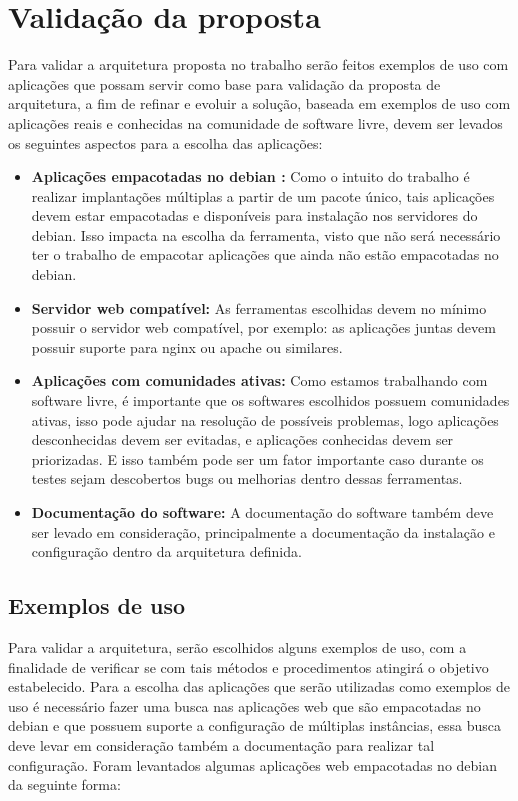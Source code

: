 \section{Validação da proposta}

Para validar a arquitetura proposta no trabalho serão feitos exemplos de uso com aplicações
que possam servir como base para validação da proposta de arquitetura, a fim de
refinar e evoluir a solução, baseada em exemplos de uso com aplicações reais e conhecidas
na comunidade de software livre, devem ser levados os seguintes aspectos para a
escolha das aplicações:

\begin{itemize}
  \item  \textbf{Aplicações empacotadas no debian :}  Como o intuito do trabalho
  é realizar implantações múltiplas a partir de um pacote único, tais aplicações
  devem estar empacotadas e disponíveis para instalação nos servidores do debian.
  Isso impacta na escolha da ferramenta, visto que não será necessário ter o trabalho
  de empacotar aplicações que ainda não estão empacotadas no debian.
  \item  \textbf{Servidor web compatível:} As ferramentas escolhidas devem no
  mínimo possuir o servidor web compatível, por exemplo: as aplicações juntas
  devem possuir suporte para nginx ou apache ou similares.
  \item  \textbf{Aplicações com comunidades ativas:} Como estamos trabalhando
  com software livre, é importante que os softwares escolhidos possuem comunidades
  ativas, isso pode ajudar na resolução de  possíveis problemas, logo aplicações
  desconhecidas devem ser evitadas, e aplicações conhecidas devem ser priorizadas.
  E isso também pode ser um fator importante caso durante os testes sejam descobertos
  bugs ou melhorias dentro dessas ferramentas.
  \item  \textbf{Documentação do software:} A documentação do software também deve
  ser levado em consideração, principalmente a documentação da instalação e configuração
  dentro da arquitetura definida.
\end{itemize}

\subsection{Exemplos de uso}

Para validar a arquitetura, serão escolhidos alguns exemplos de uso, com a
finalidade de verificar se com tais métodos e procedimentos atingirá o objetivo
estabelecido. Para a escolha das aplicações que serão utilizadas como exemplos
de uso é necessário fazer uma busca nas aplicações web que são empacotadas no
debian e que possuem suporte a configuração de múltiplas instâncias, essa busca
deve levar em consideração também a documentação para realizar tal configuração.
Foram levantados algumas aplicações web empacotadas no debian da seguinte forma:

